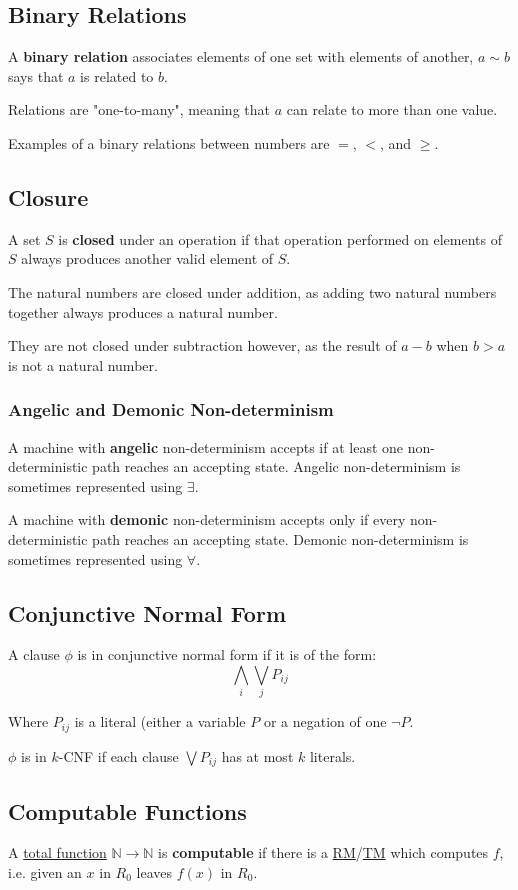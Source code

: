 \documentclass{article}
\begin{document}
\subsection{Binary Relations}\label{binary-relation}
A \textbf{binary relation} associates elements of one set with elements of another, $a \sim b$ says that $a$ is related to $b$.

Relations are "one-to-many", meaning that $a$ can relate to more than one value.

Examples of a binary relations between numbers are $=$, $<$, and $\geq$.


\subsection{Closure}\label{closure}
A set $S$ is \textbf{closed} under an operation if that operation performed on elements of $S$ always produces another valid element of $S$.

The natural numbers are closed under addition, as adding two natural numbers together always produces a natural number.

They are not closed under subtraction however, as the result of $a - b$ when $b > a$ is not a natural number.


\subsubsection{Angelic and Demonic Non-determinism}\label{angel-devil}
A machine with \textbf{angelic} non-determinism accepts if at least one non-deterministic path reaches an accepting state. Angelic non-determinism is sometimes represented using $\exists$.

A machine with \textbf{demonic} non-determinism accepts only if every non-deterministic path reaches an accepting state. Demonic non-determinism is sometimes represented using $\forall$.


\subsection{Conjunctive Normal Form}\label{cnf}
A clause $\phi$ is in conjunctive normal form if it is of the form:
\[\bigwedge_i \bigvee_j P_{ij}\]

Where $P_{ij}$ is a literal (either a variable $P$ or a negation of one $\neg P$.

$\phi$ is in $k$-CNF if each clause $\bigvee P_{ij}$ has at most $k$ literals.


\subsection{Computable Functions}\label{computable}
A \hyperref[total]{total function} $\mathbb{N} \to \mathbb{N}$ is \textbf{computable} if there is a \hyperref[rm]{RM}/\hyperref[tm]{TM} which computes $f$, i.e. given an $x$ in $R_0$ leaves $f(x)$ in $R_0$.
\end{document}

